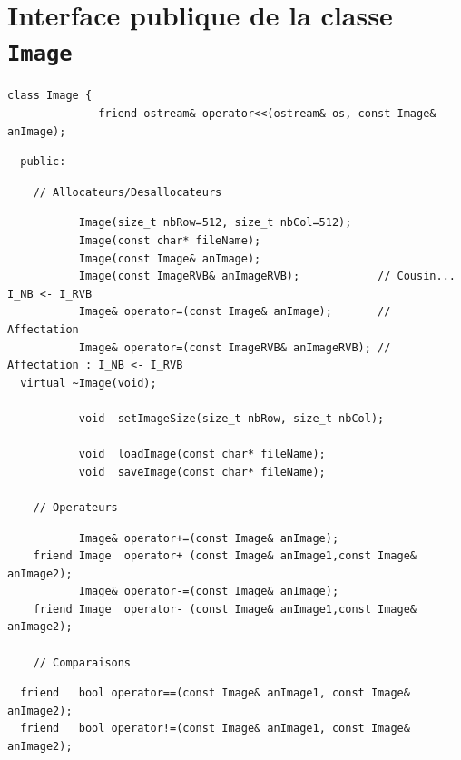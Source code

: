 \documentclass[12pt]{article}
\begin{document}
\newpage

\section{Interface publique de la classe {\tt Image}}

\vspace{-0.1cm}
\begin{footnotesize}
\begin{verbatim}
class Image {
              friend ostream& operator<<(ostream& os, const Image& anImage);
\end{verbatim}
\end{footnotesize}
\vspace{-0.4cm}
\begin{footnotesize}
\begin{verbatim}
  public:
\end{verbatim}
\vspace{-0.3cm}
\begin{verbatim}
    // Allocateurs/Desallocateurs
\end{verbatim}
\vspace{-0.2cm}
\begin{verbatim}
           Image(size_t nbRow=512, size_t nbCol=512);
           Image(const char* fileName);
           Image(const Image& anImage);
           Image(const ImageRVB& anImageRVB);            // Cousin... I_NB <- I_RVB
           Image& operator=(const Image& anImage);       // Affectation
           Image& operator=(const ImageRVB& anImageRVB); // Affectation : I_NB <- I_RVB
  virtual ~Image(void);

           void  setImageSize(size_t nbRow, size_t nbCol);

           void  loadImage(const char* fileName);
           void  saveImage(const char* fileName);

    // Operateurs
\end{verbatim}
\vspace{-0.3cm}
\begin{verbatim}
           Image& operator+=(const Image& anImage);
    friend Image  operator+ (const Image& anImage1,const Image& anImage2);
           Image& operator-=(const Image& anImage);
    friend Image  operator- (const Image& anImage1,const Image& anImage2);

    // Comparaisons
\end{verbatim}
\vspace{-0.3cm}
\begin{verbatim}
  friend   bool operator==(const Image& anImage1, const Image& anImage2);
  friend   bool operator!=(const Image& anImage1, const Image& anImage2);


\end{verbatim}
\end{footnotesize}
\end{document}
